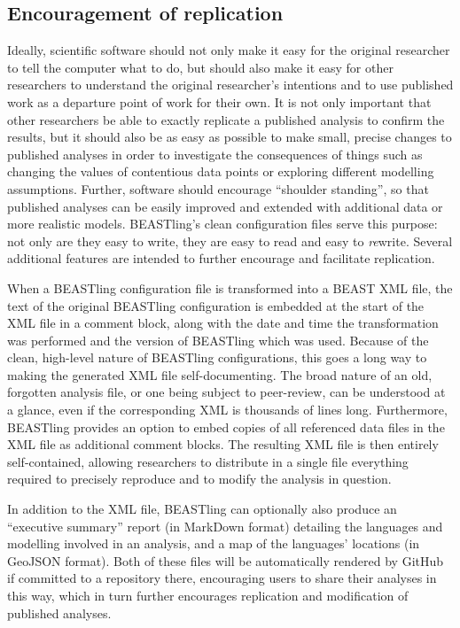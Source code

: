 \documentclass[10pt,a4paper]{article}
\begin{document}
\subsection{Encouragement of replication}

Ideally, scientific software should not only make it easy for the original researcher to tell the computer what to do, but should also make it easy for other researchers to understand the original researcher's intentions and to use published work as a departure point of work for their own.  It is not only important that other researchers be able to exactly replicate a published analysis to confirm the results, but it should also be as easy as possible to make small, precise changes to published analyses in order to investigate the consequences of things such as changing the values of contentious data points or exploring different modelling assumptions.  Further, software should encourage ``shoulder standing'', so that published analyses can be easily improved and extended with additional data or more realistic models.  BEASTling's clean configuration files serve this purpose: not only are they easy to write, they are easy to read and easy to \emph{re}write.  Several additional features are intended to further encourage and facilitate replication.

When a BEASTling configuration file is transformed into a BEAST XML file, the text of the original BEASTling configuration is embedded at the start of the XML file in a comment block, along with the date and time the transformation was performed and the version of BEASTling which was used.  Because of the clean, high-level nature of BEASTling configurations, this goes a long way to making the generated XML file self-documenting.  The broad nature of an old, forgotten analysis file, or one being subject to peer-review, can be understood at a glance, even if the corresponding XML is thousands of lines long.  Furthermore, BEASTling provides an option to embed copies of all referenced data files in the XML file as additional comment blocks.  The resulting XML file is then entirely self-contained, allowing researchers to distribute in a single file everything required to precisely reproduce and to modify the analysis in question.

In addition to the XML file, BEASTling can optionally also produce an ``executive summary'' report (in MarkDown format) detailing the languages and modelling involved in an analysis, and a map of the languages' locations (in GeoJSON format).  Both of these files will be automatically rendered by GitHub if committed to a repository there, encouraging users to share their analyses in this way, which in turn further encourages replication and modification of published analyses.
\end{document}
